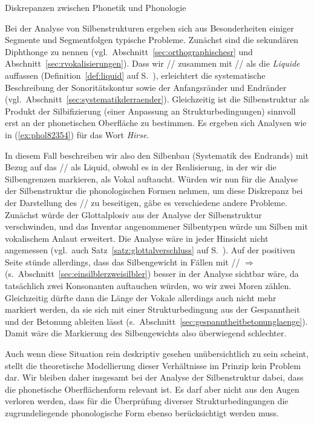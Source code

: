 \begin{Vertiefung}{Diskrepanzen zwischen Phonetik und Phonologie}


\noindent Bei der Analyse von Silbenstrukturen ergeben sich aus Besonderheiten einiger Segmente und Segmentfolgen typische Probleme.
Zunächst sind die sekundären Diphthonge zu nennen (vgl.\ Abschnitt~\ref{sec:orthographischesr} und Abschnitt~\ref{sec:rvokalisierungen}).
Dass wir // zusammen mit // als die \textit{Liquide} auffassen (Definition~\ref{def:liquid} auf S.\ \pageref{def:liquid}), erleichtert die systematische Beschreibung der Sonoritätskontur sowie der Anfangsränder und Endränder (vgl.\ Abschnitt~\ref{sec:systematikderraender}).
Gleichzeitig ist die Silbenstruktur als Produkt der Silbifizierung (einer Anpassung an Strukturbedingungen) sinnvoll erst an der phonetischen Oberfläche zu bestimmen.
Es ergeben sich Analysen wie in (\ref{ex:phol82354}) für das Wort \textit{Hirse}.

\begin{exe}
\end{exe}

In diesem Fall beschreiben wir also den Silbenbau (Systematik des Endrands) mit Bezug auf das // als Liquid, obwohl es in der Realisierung, in der wir die Silbengrenzen markieren, als Vokal \textipa{[@]} auftaucht.
Würden wir nun für die Analyse der Silbenstruktur die phonologischen Formen nehmen, um diese Diskrepanz bei der Darstellung des // zu beseitigen, gäbe es verschiedene andere Probleme.
Zunächst würde der Glottalplosiv \textipa{[P]} aus der Analyse der Silbenstruktur verschwinden, und das Inventar angenommener Silbentypen würde um Silben mit vokalischem Anlaut erweitert.
Die Analyse wäre in jeder Hinsicht nicht angemessen (vgl.\ auch Satz~\ref{satz:glottalverschluss} auf S.\ \pageref{satz:glottalverschluss}).
Auf der positiven Seite stünde allerdings, dass das Silbengewicht in Fällen mit // $\Rightarrow$ \textipa{[N]} (s.\ Abschnitt~\ref{sec:einsilblerzweisilbler}) besser in der Analyse sichtbar wäre, da tatsächlich zwei Konsonanten auftauchen würden, wo wir zwei Moren zählen.
Gleichzeitig dürfte dann die Länge der Vokale allerdings auch nicht mehr markiert werden, da sie sich mit einer Strukturbedingung aus der Gespanntheit und der Betonung ableiten lässt (s.\ Abschnitt~\ref{sec:gespanntheitbetonunglaenge}).
Damit wäre die Markierung des Silbengewichts also überwiegend schlechter.

Auch wenn diese Situation rein deskriptiv gesehen unübersichtlich zu sein scheint, stellt die theoretische Modellierung dieser Verhältnisse im Prinzip kein Problem dar.
Wir bleiben daher insgesamt bei der Analyse der Silbenstruktur dabei, dass die phonetische Oberflächenform relevant ist.
Es darf aber nicht aus den Augen verloren werden, dass für die Überprüfung diverser Strukturbedingungen die zugrundeliegende phonologische Form ebenso berücksichtigt werden muss.

\end{Vertiefung}


